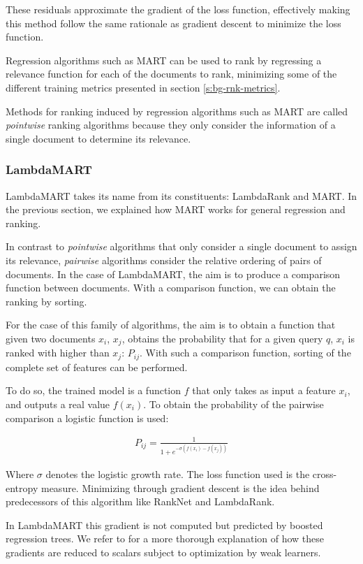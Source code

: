 These residuals approximate the gradient of the loss function, effectively making this method follow the same
rationale as gradient descent to minimize the loss function.

Regression algorithms such as MART can be used to rank
by regressing a relevance function for each of the documents to rank, minimizing some of the 
different training metrics presented in section \ref{s:bg-rnk-metrics}.

Methods for ranking induced by regression algorithms such as MART are called \emph{pointwise} ranking algorithms
because they only consider the information of a single document to determine its relevance.

\subsubsection{LambdaMART}
LambdaMART takes its name from its constituents: LambdaRank and MART. In the previous section, we 
explained how MART works for general regression and ranking.

In contrast to \emph{pointwise} algorithms that only consider a single document to assign its relevance,
\emph{pairwise} algorithms consider the relative ordering of pairs of documents. In the case of LambdaMART, 
the aim is to produce a comparison function between documents. With a comparison function, we can obtain the
ranking by sorting.

For the case of this family of algorithms, the aim is to obtain a function that given two documents $x_i$, $x_j$, 
obtains the probability that for a given query $q$, $x_i$ is ranked with higher than $x_j$: $P_{ij}$. With 
such a comparison function, sorting of the complete set of features can be performed.

To do so, the trained model is a function $f$ that only takes as input a feature $x_i$, 
and outputs a real value $f(x_i)$. To obtain the probability of the pairwise comparison a logistic function is used:

\begin{align*}
P_{ij} = \frac{1}{1+e^{-\sigma(f(x_i)-f(x_j))}}
\end{align*}

Where $\sigma$ denotes the logistic growth rate. The loss function used is the cross-entropy measure. 
Minimizing through gradient descent is the idea behind predecessors
of this algorithm like RankNet and LambdaRank.

In LambdaMART this gradient is not computed but predicted by boosted regression trees. We refer
to \cite{lambdamart} for a more thorough explanation of how these gradients are reduced to scalars
subject to optimization by weak learners.


